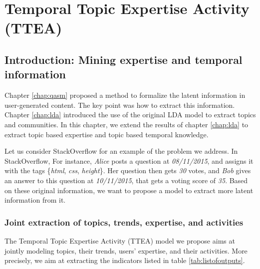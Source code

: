 \chapter{Temporal Topic Expertise Activity (TTEA)}
\doublespacing
\label{chap:ttea}
\minitoc


\section{Introduction: Mining expertise and temporal information}

Chapter \ref{chap:qasm} proposed a method to formalize the latent information in user-generated content. The key point was how to extract this information. Chapter \ref{chap:lda} introduced the use of the original LDA model to extract topics and communities. In this chapter, we extend the results of chapter \ref{chap:lda} to extract topic based expertise and topic based temporal knowledge.

Let us consider StackOverflow for an example of the problem we address. In StackOverflow, For instance, \textit{Alice} posts a question at \textit{08/11/2015}, and assigns it with the tags \{\textit{html}, \textit{css}, \textit{height}\}. Her question then gets \textit{30} votes, and \textit{Bob} gives an answer to this question at \textit{10/11/2015}, that gets a voting score of \textit{35}. Based on these original information, we want to propose a model to extract more latent information from it.

\subsection{Joint extraction of topics, trends, expertise, and activities}
The Temporal Topic Expertise Activity (TTEA) model we propose aims at jointly modeling topics, their trends, users' expertise, and their activities. 
More precisely, we aim at extracting the indicators listed in table \ref{tab:listofoutputs}. 

